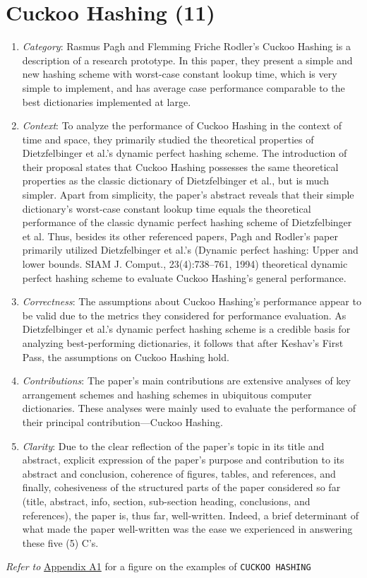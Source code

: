 \newpage
\section[Cuckoo Hashing (11)]{Cuckoo Hashing (11) \cite{Pagh2001Cuckoo}} 

\begin{enumerate}
    \item \textit{Category}: Rasmus Pagh and Flemming Friche Rodler’s Cuckoo Hashing is a description of a research prototype. In this paper, they present a simple and new hashing scheme with worst-case constant lookup time, which is very simple to implement, and has average case performance comparable to the best dictionaries implemented at large.

    \item \textit{Context}: To analyze the performance of Cuckoo Hashing in the context of time and space, they primarily studied the theoretical properties of Dietzfelbinger et al.’s dynamic perfect hashing scheme. The introduction of their proposal states that Cuckoo Hashing possesses the same theoretical properties as the classic dictionary of Dietzfelbinger et al., but is much simpler. Apart from simplicity, the paper's abstract reveals that their simple dictionary’s worst-case constant lookup time equals the theoretical performance of the classic dynamic perfect hashing scheme of Dietzfelbinger et al. Thus, besides its other referenced papers, Pagh and Rodler’s paper primarily utilized Dietzfelbinger et al.’s (Dynamic perfect hashing: Upper and lower bounds. SIAM J. Comput., 23(4):738–761, 1994) theoretical dynamic perfect hashing scheme to evaluate Cuckoo Hashing’s general performance.

    \item \textit{Correctness}: The assumptions about Cuckoo Hashing’s performance appear to be valid due to the metrics they considered for performance evaluation. As Dietzfelbinger et al.’s dynamic perfect hashing scheme is a credible basis for analyzing best-performing dictionaries, it follows that after Keshav’s First Pass, the assumptions on Cuckoo Hashing hold.

    \item \textit{Contributions}: The paper’s main contributions are extensive analyses of key arrangement schemes and hashing schemes in ubiquitous computer dictionaries. These analyses were mainly used to evaluate the performance of their principal contribution—Cuckoo Hashing.

    \item \textit{Clarity}: Due to the clear reflection of the paper’s topic in its title and abstract, explicit expression of the paper’s purpose and contribution to its abstract and conclusion, coherence of figures, tables, and references, and finally, cohesiveness of the structured parts of the paper considered so far (title, abstract, info, section, sub-section heading, conclusions, and references), the paper is, thus far, well-written. Indeed, a brief determinant of what made the paper well-written was the ease we experienced in answering these five (5) C’s. 

    
\end{enumerate}

    \textit{Refer to} \hyperref[fig1]{Appendix A1} for a figure on the examples of \texttt{CUCKOO HASHING}


